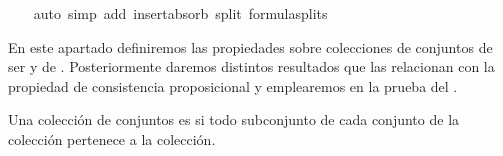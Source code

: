 \begin{isabellebody}
\ \ \isamarkupfalse%
\ {\isacharparenleft}auto\ simp\ add{\isacharcolon}\ insert{\isacharunderscore}absorb\ split{\isacharcolon}\ formula{\isachardot}splits{\isacharparenright}%
\endisatagproof
{\isafoldproof}%
%
\isadelimproof
%
\endisadelimproof
%
\isadelimdocument
%
\endisadelimdocument
%
\isatagdocument
%
\isamarkuptrue%
%
\endisatagdocument
{\isafolddocument}%
%
\isadelimdocument
%
\endisadelimdocument
%
\begin{isamarkuptext}%
En este apartado definiremos las propiedades sobre colecciones de conjuntos de ser  y de . Posteriormente daremos distintos resultados que las
  relacionan con la propiedad de consistencia proposicional y emplearemos en la prueba del 
  .



  \begin{definicion}
    Una colección de conjuntos es  si todo subconjunto de cada conjunto 
    de la colección pertenece a la colección.
  \end{definicion}


\end{isamarkuptext}
\end{isabellebody}
